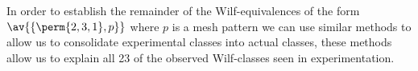 In order to establish the remainder of the Wilf-equivalences of the form \(\av{\{\perm{2,3,1},p\}}\) where \(p\)
is a mesh pattern we can use similar methods to allow us to consolidate experimental classes into
actual classes, these methods allow us to explain all 23 of the observed Wilf-classes seen in experimentation.
